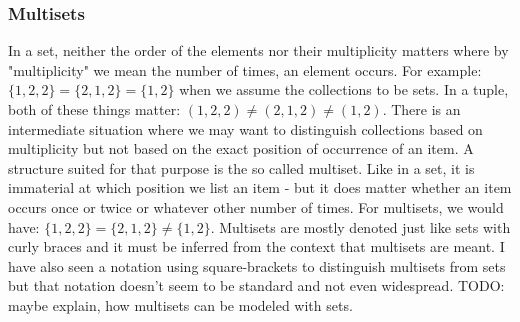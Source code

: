 


\subsubsection{Multisets}
In a set, neither the order of the elements nor their multiplicity matters where by "multiplicity" we mean the number of times, an element occurs. For example: $\{ 1,2,2 \} = \{ 2,1,2 \} = \{ 1,2 \}$ when we assume the collections to be sets. In a tuple, both of these things matter: $(1,2,2) \neq (2,1,2) \neq (1,2)$. There is an intermediate situation where we may want to distinguish collections based on multiplicity but not based on the exact position of occurrence of an item. A structure suited for that purpose is the so called multiset. Like in a set, it is immaterial at which position we list an item - but it does matter whether an item occurs once or twice or whatever other number of times. For multisets, we would have: $\{ 1,2,2 \} = \{ 2,1,2 \} \neq \{ 1,2 \}$. Multisets are mostly denoted just like sets with curly braces and it must be inferred from the context that multisets are meant. I have also seen a notation using square-brackets to distinguish multisets from sets but that notation doesn't seem to be standard and not even widespread. TODO: maybe explain, how multisets can be modeled with sets.





